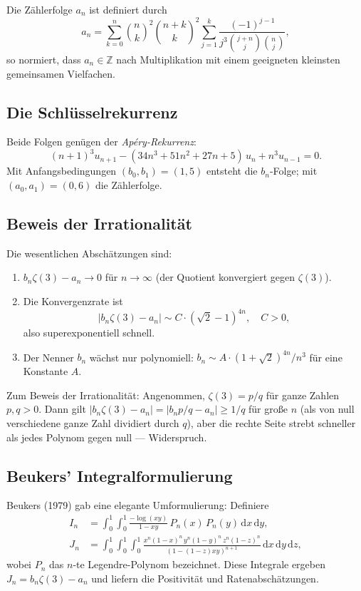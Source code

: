 \documentclass[12pt,a4paper]{amsart}
\theoremstyle{definition}
\theoremstyle{remark}
\begin{document}
Die Zählerfolge $a_n$ ist definiert durch
\[
  a_n = \sum_{k=0}^{n} \binom{n}{k}^2 \binom{n+k}{k}^2
        \sum_{j=1}^{k} \frac{(-1)^{j-1}}{j^3 \binom{j+n}{j}\binom{n}{j}},
\]
so normiert, dass $a_n \in \mathbb{Z}$ nach Multiplikation mit einem geeigneten
kleinsten gemeinsamen Vielfachen.

\subsection{Die Schlüsselrekurrenz}

Beide Folgen genügen der \emph{Apéry-Rekurrenz}:
\begin{equation}
  (n+1)^3 u_{n+1} - (34n^3 + 51n^2 + 27n + 5)\, u_n + n^3 u_{n-1} = 0.
  \label{eq:apery-rekurrenz}
\end{equation}
Mit Anfangsbedingungen $(b_0, b_1) = (1, 5)$ entsteht die $b_n$-Folge; mit
$(a_0, a_1) = (0, 6)$ die Zählerfolge.

\subsection{Beweis der Irrationalität}

Die wesentlichen Abschätzungen sind:
\begin{enumerate}[label=(\roman*)]
  \item $b_n \zeta(3) - a_n \to 0$ für $n \to \infty$ (der Quotient konvergiert
        gegen $\zeta(3)$).
  \item Die Konvergenzrate ist
        \[
          |b_n \zeta(3) - a_n| \sim C \cdot (\sqrt{2} - 1)^{4n}, \quad C > 0,
        \]
        also superexponentiell schnell.
  \item Der Nenner $b_n$ wächst nur polynomiell: $b_n \sim A \cdot
        (1 + \sqrt{2})^{4n} / n^3$ für eine Konstante $A$.
\end{enumerate}

Zum Beweis der Irrationalität: Angenommen, $\zeta(3) = p/q$ für ganze Zahlen
$p, q > 0$. Dann gilt $|b_n \zeta(3) - a_n| = |b_n p/q - a_n| \geq 1/q$ für
große $n$ (als von null verschiedene ganze Zahl dividiert durch $q$), aber die
rechte Seite strebt schneller als jedes Polynom gegen null --- Widerspruch.

\subsection{Beukers' Integralformulierung}

Beukers (1979) gab eine elegante Umformulierung: Definiere
\begin{align*}
  I_n &= \int_0^1 \!\int_0^1 \frac{-\log(xy)}{1 - xy}\, P_n(x)\, P_n(y)\,
         \mathrm{d}x\, \mathrm{d}y, \\
  J_n &= \int_0^1 \!\int_0^1 \!\int_0^1
         \frac{x^n(1-x)^n\, y^n(1-y)^n\, z^n(1-z)^n}
              {(1 - (1-z)xy)^{n+1}}\,
         \mathrm{d}x\, \mathrm{d}y\, \mathrm{d}z,
\end{align*}
wobei $P_n$ das $n$-te Legendre-Polynom bezeichnet. Diese Integrale ergeben
$J_n = b_n \zeta(3) - a_n$ und liefern die Positivität und Ratenabschätzungen.
\end{document}
